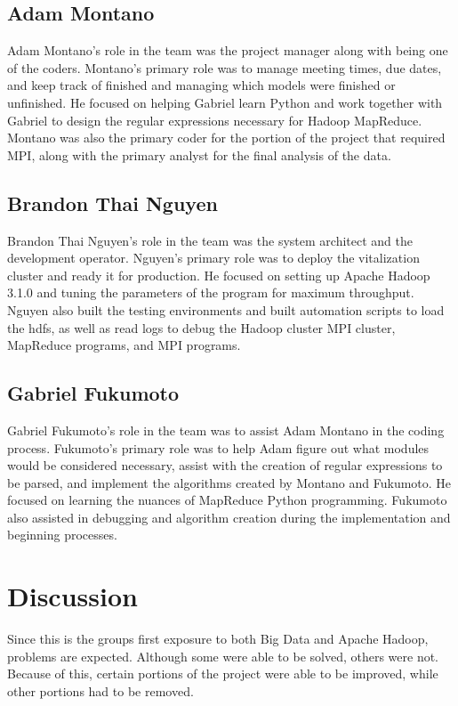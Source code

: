 \documentclass[10pt,journal,compsoc]{IEEEtran}
\begin{document}
\subsection{Adam Montano}
Adam Montano's role \cite{macro_malware}in the team was the project manager along with being one of the coders. Montano's primary role was to manage meeting times, due dates, and keep track of finished and managing which models were finished or unfinished. He focused on helping Gabriel learn Python and work together with Gabriel to design the regular expressions necessary for Hadoop MapReduce. Montano was also the primary coder for the portion of the project that required MPI, along with the primary analyst for the final analysis of the data. 

\subsection{Brandon Thai Nguyen}
Brandon Thai Nguyen's role in the team was the system architect and the development operator. Nguyen's primary role was to deploy the vitalization cluster and ready it for production. He focused on setting up Apache Hadoop 3.1.0 and tuning the parameters of the program for maximum throughput. Nguyen also built the testing environments and built automation scripts to load the hdfs, as well as read logs to debug the Hadoop cluster MPI cluster, MapReduce programs, and MPI programs.

\subsection{Gabriel Fukumoto}
Gabriel Fukumoto's role in the team was to assist Adam Montano in the coding process. Fukumoto's primary role was to help Adam figure out what modules would be considered necessary, assist with the creation of regular expressions to be parsed, and implement the algorithms created by Montano and Fukumoto. He focused on learning the nuances of MapReduce Python programming\cite{Python}. Fukumoto also assisted in debugging and algorithm creation during the implementation and beginning processes.

\section{Discussion}
Since this is the groups first exposure to both Big Data and Apache Hadoop, problems are expected. Although some were able to be solved, others were not. Because of this, certain portions of the project were able to be improved, while other portions had to be removed.
\end{document}
